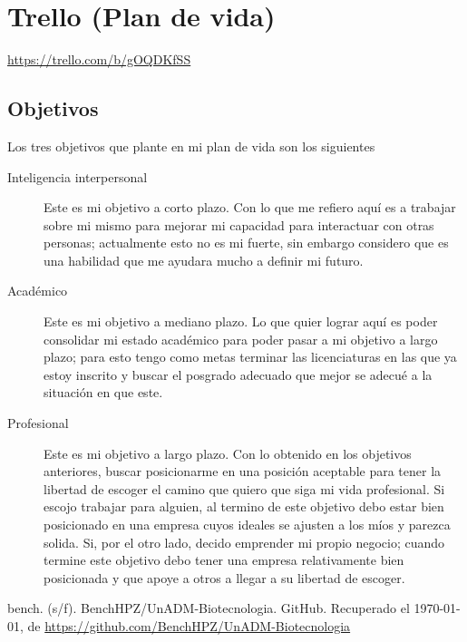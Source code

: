 \documentclass[12pt]{article}
\begin{document}
\section*{Trello (Plan de vida)}

\begin{center}
	\url{https://trello.com/b/gOQDKfSS}
\end{center}

\subsection*{Objetivos}

\par Los tres objetivos que plante en mi plan de vida son los siguientes

\begin{description}
	\item [Inteligencia interpersonal] Este es mi objetivo a corto plazo. Con lo que me refiero aquí es a trabajar sobre mi mismo para mejorar mi capacidad para interactuar con otras personas; actualmente esto no es mi fuerte, sin embargo considero que es una habilidad que me ayudara mucho a definir mi futuro.
	\item [Académico] Este es mi objetivo a mediano plazo. Lo que quier lograr aquí es poder consolidar mi estado académico para poder pasar a mi objetivo a largo plazo; para esto tengo como metas terminar las licenciaturas en las que ya estoy inscrito y buscar el posgrado adecuado que mejor se adecué a la situación en que este.
	\item [Profesional] Este es mi objetivo a largo plazo. Con lo obtenido en los objetivos anteriores, buscar posicionarme en una posición aceptable para tener la libertad de escoger el camino que quiero que siga mi vida profesional. Si escojo trabajar para alguien, al termino de este objetivo debo estar bien posicionado en una empresa cuyos ideales se ajusten a los míos y parezca solida. Si, por el otro lado, decido emprender mi propio negocio; cuando termine este objetivo debo tener una empresa relativamente bien posicionada y que apoye a otros a llegar a su libertad de escoger.
\end{description}



\begin{thebibliography}{X}
	
	 bench. (s/f). BenchHPZ/UnADM-Biotecnologia. GitHub. Recuperado el \today, de \url{https://github.com/BenchHPZ/UnADM-Biotecnologia}

\end{thebibliography}
\end{document}
